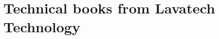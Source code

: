 \documentclass[14pt,fleqn]{extbook} %
\begin{document}
\section{Technical books from Lavatech Technology}








\end{document}
